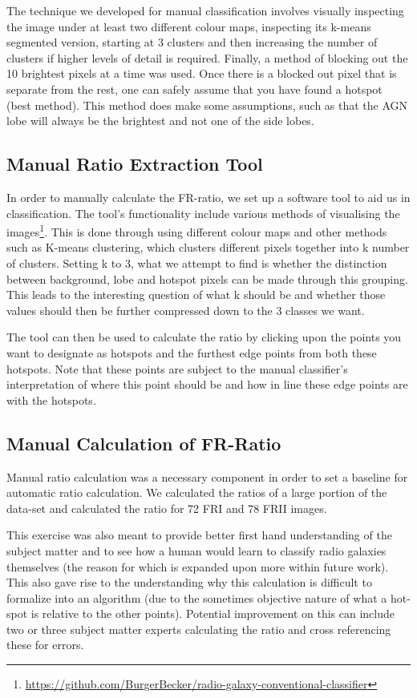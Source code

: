 \documentclass[conference]{IEEEtran}
\begin{document}
The technique we developed for manual classification involves visually inspecting the image under at least two different colour maps, inspecting its k-means segmented version, starting at 3 clusters and then increasing the number of clusters if higher levels of detail is required. Finally, a method of blocking out the 10 brightest pixels at a time was used. Once there is a blocked out pixel that is separate from the rest, one can safely assume that you have found a hotspot (best method). This method does make some assumptions, such as that the AGN lobe will always be the brightest and not one of the side lobes.

\subsection{Manual Ratio Extraction Tool}

In order to manually calculate the FR-ratio, we set up a software tool to aid us in classification. The tool's functionality include various methods of visualising the images\footnote{\url{https://github.com/BurgerBecker/radio-galaxy-conventional-classifier}}. This is done through using different colour maps  and other methods such as K-means clustering, which clusters different pixels together into k number of clusters. 
Setting k to 3, what we attempt to find is whether the distinction between background, lobe and hotspot pixels can be made through this grouping. This leads to the interesting question of what k should be and whether those values should then be further compressed down to the 3 classes we want.

The tool can then be used to calculate the ratio by clicking upon the points you want to designate as hotspots and the furthest edge points from both these hotspots. Note that these points are subject to the manual classifier's interpretation of where this point should be and how in line these edge points are with the hotspots.

\subsection{Manual Calculation of FR-Ratio}
Manual ratio calculation was a necessary component in order to set a baseline for automatic ratio calculation. We calculated the ratios of a large portion of the data-set and calculated the ratio for 72 FRI and 78 FRII images.

This exercise was also meant to provide better first hand understanding of the subject matter and to see how a human would learn to classify radio galaxies themselves (the reason for which is expanded upon more within future work). This also  gave rise to the understanding why this calculation is difficult to formalize into an algorithm (due to the sometimes objective nature of what a hot-spot is relative to the other points). Potential improvement on this can include two or three subject matter experts calculating the ratio and cross referencing these for errors.
\end{document}
